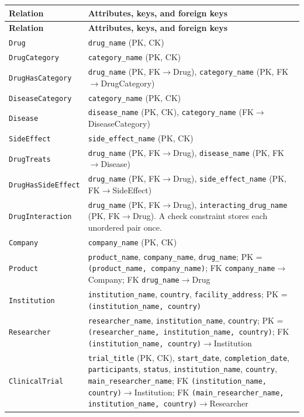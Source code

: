 \documentclass[12pt,a4paper]{article}
\begin{document}
\renewcommand{\arraystretch}{1.18}
\begin{longtable}{p{} p{}}
\toprule
\textbf{Relation} & \textbf{Attributes, keys, and foreign keys} \\
\midrule
\endfirsthead
\toprule
\textbf{Relation} & \textbf{Attributes, keys, and foreign keys} \\
\midrule
\endhead
\texttt{Drug} & \texttt{drug\_name} (PK, CK) \\
\texttt{DrugCategory} & \texttt{category\_name} (PK, CK) \\
\texttt{DrugHasCategory} & \texttt{drug\_name} (PK, FK$\rightarrow$Drug), \texttt{category\_name} (PK, FK$\rightarrow$DrugCategory) \\
\texttt{DiseaseCategory} & \texttt{category\_name} (PK, CK) \\
\texttt{Disease} & \texttt{disease\_name} (PK, CK), \texttt{category\_name} (FK$\rightarrow$DiseaseCategory) \\
\texttt{SideEffect} & \texttt{side\_effect\_name} (PK, CK) \\
\texttt{DrugTreats} & \texttt{drug\_name} (PK, FK$\rightarrow$Drug), \texttt{disease\_name} (PK, FK$\rightarrow$Disease) \\
\texttt{DrugHasSideEffect} & \texttt{drug\_name} (PK, FK$\rightarrow$Drug), \texttt{side\_effect\_name} (PK, FK$\rightarrow$SideEffect) \\
\texttt{DrugInteraction} & \texttt{drug\_name} (PK, FK$\rightarrow$Drug), \texttt{interacting\_drug\_name} (PK, FK$\rightarrow$Drug). A check constraint stores each unordered pair once. \\
\texttt{Company} & \texttt{company\_name} (PK, CK) \\
\texttt{Product} & \texttt{product\_name}, \texttt{company\_name}, \texttt{drug\_name}; PK = \texttt{(product\_name, company\_name)}; FK \texttt{company\_name}$\rightarrow$Company; FK \texttt{drug\_name}$\rightarrow$Drug \\
\texttt{Institution} & \texttt{institution\_name}, \texttt{country}, \texttt{facility\_address}; PK = \texttt{(institution\_name, country)} \\
\texttt{Researcher} & \texttt{researcher\_name}, \texttt{institution\_name}, \texttt{country}; PK = \texttt{(researcher\_name, institution\_name, country)}; FK \texttt{(institution\_name, country)}$\rightarrow$Institution \\
\texttt{ClinicalTrial} & \texttt{trial\_title} (PK, CK), \texttt{start\_date}, \texttt{completion\_date}, \texttt{participants}, \texttt{status}, \texttt{institution\_name}, \texttt{country}, \texttt{main\_researcher\_name}; FK \texttt{(institution\_name, country)}$\rightarrow$Institution; FK \texttt{(main\_researcher\_name, institution\_name, country)}$\rightarrow$Researcher \\

\end{longtable}
\end{document}
